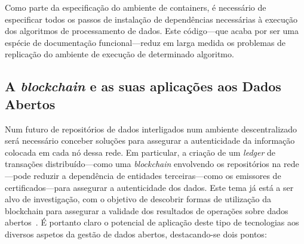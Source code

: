 \documentclass[sigconf,nonacm]{acmart}
\begin{document}
Como parte da especificação do ambiente de containers, é necessário de especificar todos os passos de instalação de dependências necessárias à execução dos algoritmos de processamento de dados. Este código---que acaba por ser uma espécie de documentação funcional---reduz em larga medida os problemas de replicação do ambiente de execução de determinado algoritmo.


\subsection{A \emph{blockchain} e as suas aplicações aos Dados Abertos} %
\label{sub:a_emph_blockchain_e_as_suas_aplicacoes_aos_dados_abertos}

Num futuro de repositórios de dados interligados num ambiente descentralizado será necessário conceber soluções para assegurar a autenticidade da informação colocada em cada nó dessa rede. Em particular, a criação de um \emph{ledger} de transações distribuído---como uma \emph{blockchain} envolvendo os repositórios na rede---pode reduzir a dependência de entidades terceiras---como os emissores de certificados---para assegurar a autenticidade dos dados. Este tema já está a ser alvo de investigação, com o objetivo de descobrir formas de utilização da blockchain para assegurar a validade dos resultados de operações sobre dados abertos~\cite{10.1007/978-3-030-23946-6_28}. É portanto claro o potencial de aplicação deste tipo de tecnologias aos diversos aspetos da gestão de dados abertos, destacando-se dois pontos:
\end{document}
